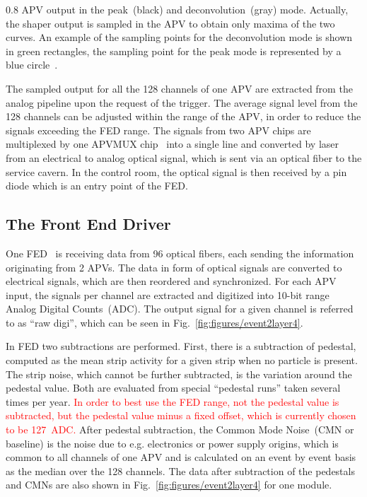                  {0.8}       %
                 {APV output in the peak~(black) and deconvolution~(gray) mode. Actually, the shaper output is sampled in the APV to obtain only maxima of the two curves. An example of the sampling points for the deconvolution mode is shown in green rectangles, the sampling point for the peak mode is represented by a blue circle~\cite{Friedl:2001kra}.} %


The sampled output for all the 128 channels of one APV are extracted from the analog pipeline upon the request of the trigger. The average signal level from the 128 channels can be adjusted within the range of the APV, in order to reduce the signals exceeding the FED range. The signals from two APV chips are multiplexed by one APVMUX chip~\cite{Ball:2007zza} into a single line and converted by laser from an electrical to analog optical signal, which is sent via an optical fiber to the service cavern. In the control room, the optical signal is then received by a pin diode which is an entry point of the FED.


\subsection{The Front End Driver \label{sec:FED}}
One FED~\cite{Baird:2002wg} is receiving data from 96 optical fibers, each sending the information originating from 2 APVs. The data in form of optical signals are converted to electrical signals, which are then reordered and synchronized. For each APV input, the signals per channel are extracted and digitized into 10-bit range Analog Digital Counts~(ADC). The output signal for a given channel is referred to as ``raw digi'', which can be seen in Fig.~\ref{fig:figures/event2layer4}.

In FED two subtractions are performed. First, there is a subtraction of pedestal, computed as the mean strip activity for a given strip when no particle is present. The strip noise, which cannot be further subtracted, is the variation around the pedestal value. Both are evaluated from special ``pedestal runs'' taken several times per year. \textcolor{red}{In order to best use the FED range, not the pedestal value is subtracted, but the pedestal value minus a fixed offset, which is currently chosen to be 127~ADC.} After pedestal subtraction, the Common Mode Noise~(CMN or baseline) is the noise due to e.g. electronics or power supply origins, which is common to all channels of one APV and is calculated on an event by event basis as the median over the 128 channels. The data after subtraction of the pedestals and CMNs are also shown in Fig.~\ref{fig:figures/event2layer4} for one module. 

